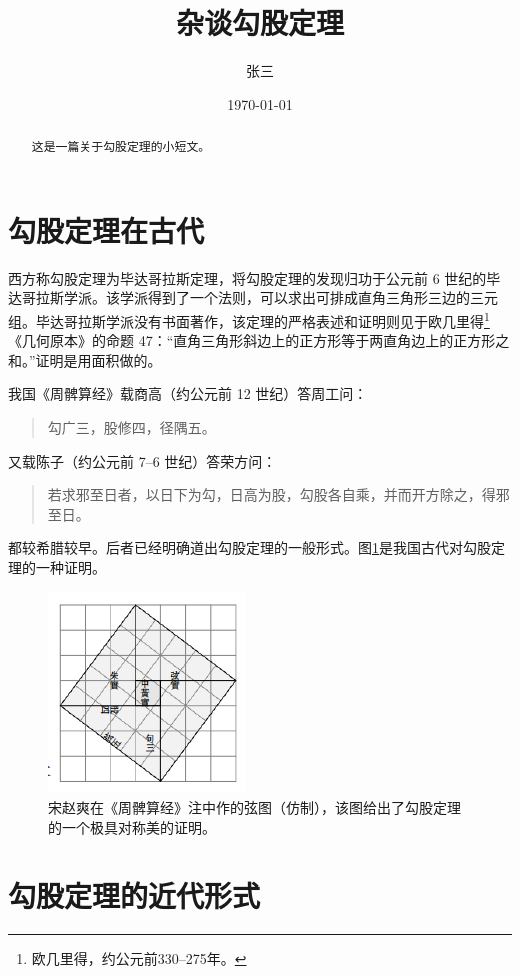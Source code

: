 \documentclass[UTF8]{ctexart}
\title{\heiti 杂谈勾股定理}
\author{\kaishu 张三}
\date{\today}
\newenvironment{myquote}
{ \begin{quote} \kaishu \zihao{-5} }
{ \end{quote} }
\begin{document}
\maketitle

\begin{abstract}
    这是一篇关于勾股定理的小短文。
\end{abstract}

\tableofcontents
\section{勾股定理在古代}\label{sec:1}
西方称勾股定理为毕达哥拉斯定理，将勾股定理的发现归功于公元前 6 世纪的毕达哥拉斯学派\cite{Kline}。该学派得到了一个法则，可以求出可排成直角三角形三边的三元组。毕达哥拉斯学派没有书面著作，该定理的严格表述和证明则见于欧几里得\footnote{欧几里得，约公元前330--275年。}《几何原本》的命题 47：“直角三角形斜边上的正方形等于两直角边上的正方形之和。”证明是用面积做的。


我国《周髀算经》载商高（约公元前 12 世纪）答周工问：
\begin{myquote}
    勾广三，股修四，径隅五。
\end{myquote}
又载陈子（约公元前 7--6 世纪）答荣方问：
\begin{myquote}
    若求邪至日者，以日下为勾，日高为股，勾股各自乘，并而开方除之，得邪至日。
\end{myquote}
都较希腊较早。后者已经明确道出勾股定理的一般形式。图\ref{fig:xiantu}是我国古代对勾股定理的一种证明\cite{quanjing}。

\begin{figure}[ht]
    \centering
    \includegraphics[scale=0.8]{xiantu.pdf}
    \caption{宋赵爽在《周髀算经》注中作的弦图（仿制），该图给出了勾股定理的一个极具对称美的证明。}
    \label{fig:xiantu}
\end{figure}

\section{勾股定理的近代形式}
\end{document}
